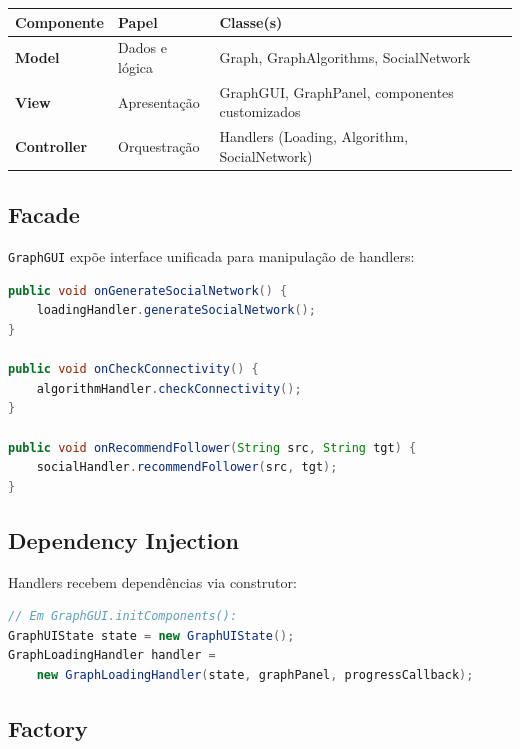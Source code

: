 \documentclass[12pt,a4paper]{article}
\begin{document}
    \begin{table}[h]
        \centering
        \begin{tabular}{|l|l|l|}
            \hline
            \textbf{Componente} & \textbf{Papel} & \textbf{Classe(s)} \\
            \hline
            \textbf{Model} & Dados e lógica & Graph, GraphAlgorithms, SocialNetwork \\
            \hline
            \textbf{View} & Apresentação & GraphGUI, GraphPanel, componentes customizados \\
            \hline
            \textbf{Controller} & Orquestração & Handlers (Loading, Algorithm, SocialNetwork) \\
            \hline
        \end{tabular}
    \end{table}

    \subsection{Facade}

    \texttt{GraphGUI} expõe interface unificada para manipulação de handlers:

    \begin{lstlisting}[language=Java, caption=Facade em GraphGUI]
public void onGenerateSocialNetwork() {
    loadingHandler.generateSocialNetwork();
}

public void onCheckConnectivity() {
    algorithmHandler.checkConnectivity();
}

public void onRecommendFollower(String src, String tgt) {
    socialHandler.recommendFollower(src, tgt);
}
    \end{lstlisting}

    \subsection{Dependency Injection}

    Handlers recebem dependências via construtor:

    \begin{lstlisting}[language=Java, caption=Injeção de Dependência]
// Em GraphGUI.initComponents():
GraphUIState state = new GraphUIState();
GraphLoadingHandler handler =
    new GraphLoadingHandler(state, graphPanel, progressCallback);
    \end{lstlisting}

    \subsection{Factory}
\end{document}
